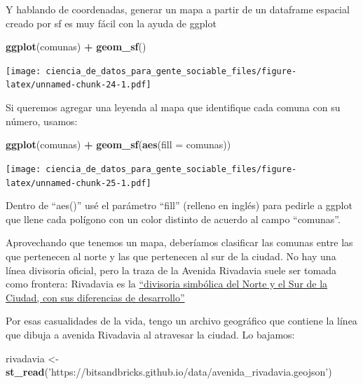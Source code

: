 \documentclass[spanish,]{book}
\newenvironment{Shaded}{\begin{snugshade}}{\end{snugshade}}
\newcommand{\DataTypeTok}[1]{\textcolor[rgb]{0.13,0.29,0.53}{#1}}
\newcommand{\KeywordTok}[1]{\textcolor[rgb]{0.13,0.29,0.53}{\textbf{#1}}}
\newcommand{\NormalTok}[1]{#1}
\newcommand{\OperatorTok}[1]{\textcolor[rgb]{0.81,0.36,0.00}{\textbf{#1}}}
\newcommand{\StringTok}[1]{\textcolor[rgb]{0.31,0.60,0.02}{#1}}
\begin{document}
Y hablando de coordenadas, generar un mapa a partir de un dataframe espacial creado por sf es muy fácil con la ayuda de ggplot

\begin{Shaded}
\begin{Highlighting}[]
\KeywordTok{ggplot}\NormalTok{(comunas) }\OperatorTok{+}
\StringTok{    }\KeywordTok{geom_sf}\NormalTok{()}
\end{Highlighting}
\end{Shaded}

\texttt{[image: ciencia\_de\_datos\_para\_gente\_sociable\_files/figure-latex/unnamed-chunk-24-1.pdf]}

Si queremos agregar una leyenda al mapa que identifique cada comuna con su número, usamos:

\begin{Shaded}
\begin{Highlighting}[]
\KeywordTok{ggplot}\NormalTok{(comunas) }\OperatorTok{+}
\StringTok{    }\KeywordTok{geom_sf}\NormalTok{(}\KeywordTok{aes}\NormalTok{(}\DataTypeTok{fill =}\NormalTok{ comunas))}
\end{Highlighting}
\end{Shaded}

\texttt{[image: ciencia\_de\_datos\_para\_gente\_sociable\_files/figure-latex/unnamed-chunk-25-1.pdf]}

Dentro de ``aes()'' usé el parámetro ``fill'' (relleno en inglés) para pedirle a ggplot que llene cada polígono con un color distinto de acuerdo al campo ``comunas''.

Aprovechando que tenemos un mapa, deberíamos clasificar las comunas entre las que pertenecen al norte y las que pertenecen al sur de la ciudad. No hay una línea divisoria oficial, pero la traza de la Avenida Rivadavia suele ser tomada como frontera: Rivadavia es la \href{https://www.clarin.com/ediciones-anteriores/avenida-rivadaviaun-largo-recorrido-contrastes_0_B1reo181CYe.html}{``divisoria simbólica del Norte y el Sur de la Ciudad, con sus diferencias de desarrollo''}

Por esas casualidades de la vida, tengo un archivo geográfico que contiene la línea que dibuja a avenida Rivadavia al atravesar la ciudad. Lo bajamos:

\begin{Shaded}
\begin{Highlighting}[]
\NormalTok{rivadavia <-}\StringTok{ }\KeywordTok{st_read}\NormalTok{(}\StringTok{'https://bitsandbricks.github.io/data/avenida_rivadavia.geojson'}\NormalTok{)}
\end{Highlighting}
\end{Shaded}
\end{document}
